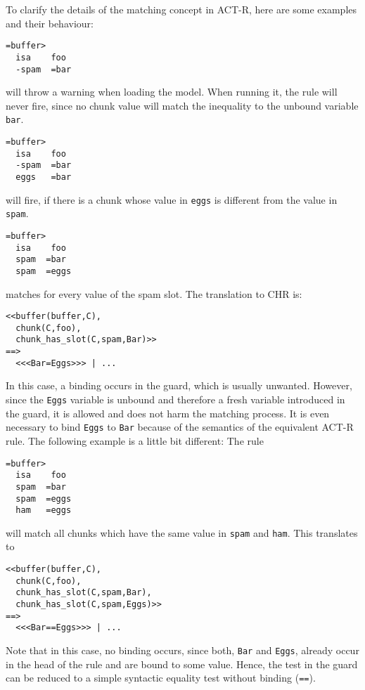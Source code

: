 \begin{example}
To clarify the details of the matching concept in ACT-R, here are some examples and their behaviour:

\begin{lstlisting}
=buffer>
  isa    foo
  -spam  =bar
\end{lstlisting}

will throw a warning when loading the model. When running it, the rule will never fire, since no chunk value will match the inequality to the unbound variable \lstinline|bar|.

\begin{lstlisting}
=buffer>
  isa    foo
  -spam  =bar
  eggs   =bar
\end{lstlisting}

will fire, if there is a chunk whose value in \lstinline|eggs| is different from the value in \lstinline|spam|.

\begin{lstlisting}
=buffer>
  isa    foo
  spam  =bar
  spam  =eggs
\end{lstlisting}

matches for every value of the spam slot. The translation to CHR is:

\begin{lstlisting}
<<buffer(buffer,C),
  chunk(C,foo),
  chunk_has_slot(C,spam,Bar)>>
==>
  <<<Bar=Eggs>>> | ...
\end{lstlisting}

In this case, a binding occurs in the guard, which is usually unwanted. However, since the \lstinline|Eggs| variable is unbound and therefore a fresh variable introduced in the guard, it is allowed and does not harm the matching process. It is even necessary to bind \lstinline|Eggs| to \lstinline|Bar| because of the semantics of the equivalent ACT-R rule. The following example is a little bit different: The rule

\begin{lstlisting}
=buffer>
  isa    foo
  spam  =bar
  spam  =eggs
  ham   =eggs
\end{lstlisting}

will match all chunks which have the same value in \lstinline|spam| and \lstinline|ham|. This translates to

\begin{lstlisting}
<<buffer(buffer,C),
  chunk(C,foo),
  chunk_has_slot(C,spam,Bar),
  chunk_has_slot(C,spam,Eggs)>>
==>
  <<<Bar==Eggs>>> | ...
\end{lstlisting}

Note that in this case, no binding occurs, since both, \lstinline|Bar| and \lstinline|Eggs|, already occur in the head of the rule and are bound to some value. Hence, the test in the guard can be reduced to a simple syntactic equality test without binding (\lstinline|==|).

\end{example}

